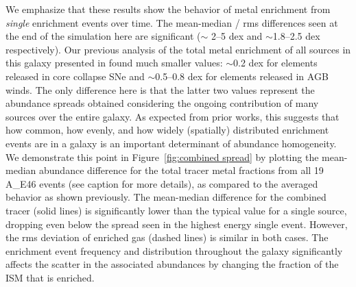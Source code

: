 \documentclass[twocolumn]{aastex62}
\newcommand{\runone}{A\_}
\begin{document}
We emphasize that these results show the behavior of metal enrichment from \textit{single} enrichment events over time. The mean-median / rms differences seen at the end of the simulation here are significant ($\sim$ 2--5 dex and $\sim$1.8--2.5 dex respectively). Our previous analysis of the total metal enrichment of all sources in this galaxy presented in \cite{Emerick2018b} found much smaller values: $\sim$0.2 dex for elements released in core collapse SNe and $\sim$0.5--0.8 dex for elements released in AGB winds. The only difference here is that the latter two values represent the abundance spreads obtained considering the ongoing contribution of many sources over the entire galaxy. As expected from prior works, this suggests that how common, how evenly, and how widely (spatially) distributed enrichment events are in a galaxy is an important determinant of abundance homogeneity. We demonstrate this point in Figure~\ref{fig:combined spread} by plotting the mean-median abundance difference for the total tracer metal fractions from all 19 \runone E46 events (see caption for more details), as compared to the averaged behavior as shown previously. The mean-median difference for the combined tracer (solid lines) is significantly lower than the typical value for a single source, dropping even below the spread seen in the highest energy single event. However, the rms deviation of enriched gas (dashed lines) is similar in both cases. The enrichment event frequency and distribution throughout the galaxy significantly affects the scatter in the associated abundances by changing the fraction of the ISM that is enriched. 
\end{document}

